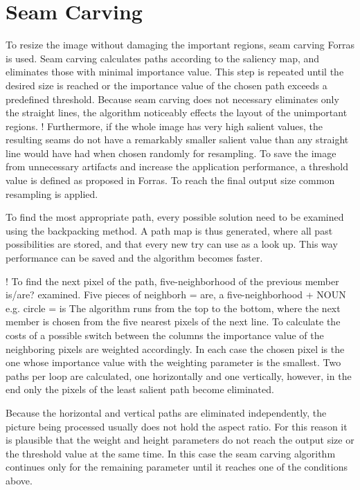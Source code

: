 \documentclass[draft,final]{vutinfth} %
\begin{document}
	\section{Seam Carving}
	To resize the image without damaging the important regions, seam carving Forras is used.
	Seam carving calculates paths according to the saliency map, and eliminates those with minimal importance value.
	This step is repeated until the desired size is reached or the importance value of the chosen path exceeds a predefined threshold.
	Because seam carving does not necessary eliminates only the straight lines, the algorithm noticeably effects the layout of the unimportant regions.
	! Furthermore, if the whole image has very high salient values, the resulting seams do not have a remarkably smaller salient value than any straight line would have had when chosen randomly for resampling.
	To save the image from unnecessary artifacts and increase the application performance, a threshold value is defined as proposed in Forras.
	To reach the final output size common resampling is applied.\par 
	To find the most appropriate path, every possible solution need to be examined using the backpacking method.
	A path map is thus generated, where all past possibilities are stored, and that every new try can use as a look up.
	This way performance can be saved and the algorithm becomes faster.\par 
	! To find the next pixel of the path, five-neighborhood of the previous member is/are? examined. Five pieces of neighborh = are, a five-neighborhood + NOUN e.g. circle = is
	The algorithm runs from the top to the bottom, where the next member is chosen from the five nearest pixels of the next line.
	To calculate the costs of a possible switch between the columns the importance value of the neighboring pixels are weighted accordingly.
	In each case the chosen pixel is the one whose importance value with the weighting parameter is the smallest.
	Two paths per loop are calculated, one horizontally and one vertically, however, in the end only the pixels of the least salient path become eliminated.\par 
	Because the horizontal and vertical paths are eliminated independently, the picture being processed usually does not hold the aspect ratio.
	For this reason it is plausible that the weight and height parameters do not reach the output size or the threshold value at the same time.
	In this case the seam carving algorithm continues only for the remaining parameter until it reaches one of the conditions above. 
\end{document}

